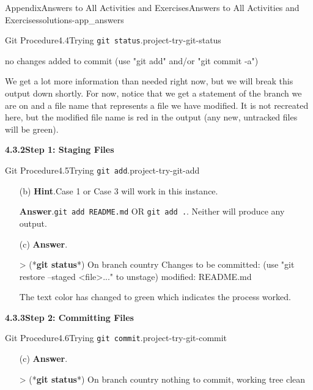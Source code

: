 \documentclass[twoside,10pt,]{book}
\newcommand{\blocktitlefont}{\relax}
\newcommand{\mono}[1]{\texttt{#1}}
\newcommand{\consoleinput}[1]{\textbf{#1}}
\begin{document}
\begin{solutions-chapter}{Appendix}{Answers to All Activities and Exercises}{}{Answers to All Activities and Exercises}{}{}{solutions-app_answers}
\begin{projectsolution}{Git Procedure}{4.4}{Trying \mono{git status}.}{project-try-git-status}
\begin{console}{0}{1}{0}
no changes added to commit (use "git add" and/or "git commit -a")
\end{console}
We get a lot more information than needed right now, but we will break this output down shortly. For now, notice that we get a statement of the branch we are on and a file name that represents a file we have modified. It is not recreated here, but the modified file name is red in the output (any new, untracked files will be green).%
\end{projectsolution}%
\par\medskip
\noindent\textbf{\Large{}4.3.2\space\textperiodcentered\space{}Step 1: Staging Files}
\begin{projectsolution}{Git Procedure}{4.5}{Trying \mono{git add}.}{project-try-git-add}%
\begin{enumerate}[font=\bfseries,label=(\alph*),ref=\alph*]%
\item[(b)]\noindent\textbf{\blocktitlefont Hint}.\hypertarget{hint-try-git-add-d-b-back}{}\quad{}Case 1 or Case 3 will work in this instance.%
\par\smallskip%
\noindent\textbf{\blocktitlefont Answer}.\hypertarget{answer-try-git-add-d-c-back}{}\quad{}\mono{git add README.md} OR \mono{git add .}. Neither will produce any output.%
\item[(c)]\noindent\textbf{\blocktitlefont Answer}.\hypertarget{answer-try-git-add-e-b-back}{}\quad{}\begin{console}{0}{1}{0}
> (*\consoleinput{git status}*)
On branch country
Changes to be committed:
  (use "git restore --staged <file>..." to unstage)
        modified:   README.md
\end{console}
The text color has changed to green which indicates the process worked.%
\end{enumerate}%
\end{projectsolution}%
\par\medskip
\noindent\textbf{\Large{}4.3.3\space\textperiodcentered\space{}Step 2: Committing Files}
\begin{projectsolution}{Git Procedure}{4.6}{Trying \mono{git commit}.}{project-try-git-commit}%
\begin{enumerate}[font=\bfseries,label=(\alph*),ref=\alph*]%
\item[(c)]\noindent\textbf{\blocktitlefont Answer}.\hypertarget{answer-try-git-commit-e-b-back}{}\quad{}\begin{console}{0}{1}{0}
> (*\consoleinput{git status}*)
On branch country
nothing to commit, working tree clean
\end{console}

\end{enumerate}
\end{projectsolution}
\end{solutions-chapter}
\end{document}
